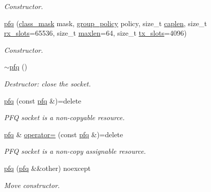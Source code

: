 \begin{DoxyCompactItemize}
\begin{DoxyCompactList}\small\item\em Constructor. \end{DoxyCompactList}\item 
\hyperlink{classnet_1_1pfq_a2594ef768ba2ebd93b778f685b25301a}{pfq} (\hyperlink{namespacenet_a1dbd93552dc6ef6fbb0bb79d43ca22fd}{class\+\_\+mask} mask, \hyperlink{namespacenet_aedc1a0dde937ddbd0800af02920b1067}{group\+\_\+policy} policy, size\+\_\+t \hyperlink{classnet_1_1pfq_aa915603b2ad8d1226f9bbea0050945c0}{caplen}, size\+\_\+t \hyperlink{classnet_1_1pfq_a878c768492c68fc572a994a58913a3db}{rx\+\_\+slots}=65536, size\+\_\+t \hyperlink{classnet_1_1pfq_a0424e39990711493af4f24a0c3e9be4d}{maxlen}=64, size\+\_\+t \hyperlink{classnet_1_1pfq_aae98015b961c6210081fa29a2ea34da2}{tx\+\_\+slots}=4096)
\begin{DoxyCompactList}\small\item\em Constructor. \end{DoxyCompactList}\item 
\hyperlink{classnet_1_1pfq_acf552123cd0e53eb5b96a4e1eb1b50a2}{$\sim$pfq} ()
\begin{DoxyCompactList}\small\item\em Destructor\+: close the socket. \end{DoxyCompactList}\item 
\hyperlink{classnet_1_1pfq_aafcf0308f9f4a0da319b8b688b2ad3a9}{pfq} (const \hyperlink{classnet_1_1pfq}{pfq} \&)=delete
\begin{DoxyCompactList}\small\item\em P\+F\+Q socket is a non-\/copyable resource. \end{DoxyCompactList}\item 
\hyperlink{classnet_1_1pfq}{pfq} \& \hyperlink{classnet_1_1pfq_a6a00af55f2109382c2cc20a47da43623}{operator=} (const \hyperlink{classnet_1_1pfq}{pfq} \&)=delete
\begin{DoxyCompactList}\small\item\em P\+F\+Q socket is a non-\/copy assignable resource. \end{DoxyCompactList}\item 
\hyperlink{classnet_1_1pfq_acce7496d2c4308539cc0360793683acd}{pfq} (\hyperlink{classnet_1_1pfq}{pfq} \&\&other) noexcept
\begin{DoxyCompactList}\small\item\em Move constructor. \end{DoxyCompactList}\item 

\end{DoxyCompactItemize}
